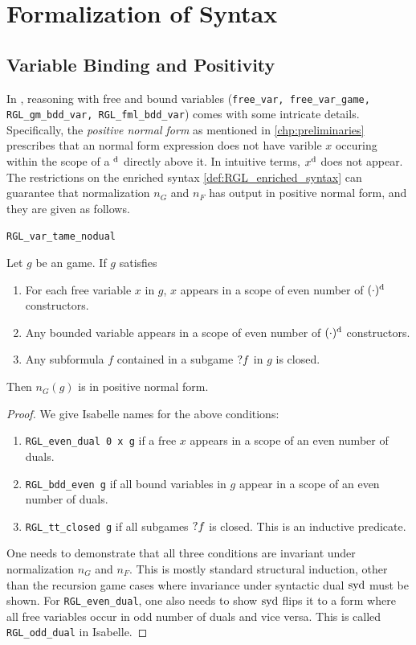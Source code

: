 \section{Formalization of Syntax}
\label{sec:formal_syntax}

\subsection{Variable Binding and Positivity}
In \RGL{}, reasoning with free and bound variables (\texttt{free\_var, free\_var\_game, RGL\_gm\_bdd\_var, RGL\_fml\_bdd\_var}) comes with some intricate details. Specifically, the \textit{positive normal form} as mentioned in \autoref{chp:preliminaries} prescribes that an \RGL{} normal form expression does not have varible $x$ occuring within the scope of a $^\text{d}$ directly above it. In intuitive terms, $x^\text{d}$ does not appear. The restrictions on the enriched \RGL{} syntax \autoref{def:RGL_enriched_syntax} can guarantee that normalization $n_G$ and $n_F$ has output in positive normal form, and they are given as follows.

\begin{blemma}

\texttt{RGL\_var\_tame\_nodual}

Let $g$ be an \RGL{} game. If $g$ satisfies

\begin{enumerate}
    \item For each free variable $x$ in $g$, $x$ appears in a scope of even number of $(\cdot)^\text{d}$ constructors.
    \item Any bounded variable appears in a scope of even number of $(\cdot)^\text{d}$ constructors.
    \item Any subformula $f$ contained in a subgame $\text{?} f$ in $g$ is closed.
\end{enumerate}

Then $n_G(g)$ is in positive normal form.
    
\end{blemma}
\begin{proof}
    We give Isabelle names for the above conditions:
    \begin{enumerate}
        \item \texttt{RGL\_even\_dual 0 x g} if a free $x$ appears in a scope of an even number of duals.
        \item \texttt{RGL\_bdd\_even g} if all bound variables in $g$ appear in a scope of an even number of duals.
        \item \texttt{RGL\_tt\_closed g} if all subgames $\text{?} f$ is closed. This is an inductive predicate.
    \end{enumerate}
    One needs to demonstrate that all three conditions are invariant under normalization $n_G$ and $n_F$. This is mostly standard structural induction, other than the recursion game cases where invariance under syntactic dual $\operatorname{syd}$ must be shown. For \texttt{RGL\_even\_dual}, one also needs to show $\operatorname{syd}$ flips it to a form where all free variables occur in odd number of duals and vice versa. This is called \texttt{RGL\_odd\_dual} in Isabelle. 
\end{proof}

